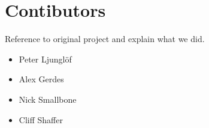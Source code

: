 \section*{Contibutors}

Reference to original project and explain what we did.

\begin{itemize}
  \item Peter Ljunglöf
  \item Alex Gerdes
  \item Nick Smallbone
  \item Cliff Shaffer
\end{itemize}

\newpage
